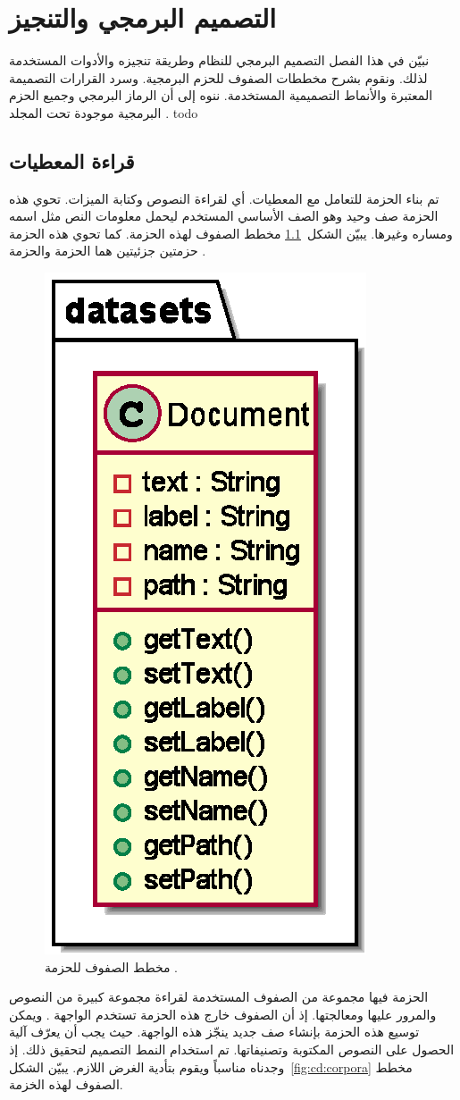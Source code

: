 

\chapter{التصميم البرمجي والتنجيز}
نبيّن في هذا الفصل التصميم البرمجي للنظام وطريقة تنجيزه والأدوات المستخدمة لذلك.
ونقوم بشرح مخططات الصفوف للحزم البرمجية.
وسرد القرارات التصميمة المعتبرة والأنماط التصميمية  المستخدمة.
ننوه إلى أن الرماز البرمجي وجميع الحزم البرمجية موجودة تحت المجلد .
todo




\section{قراءة المعطيات}
تم بناء الحزمة  للتعامل مع المعطيات. أي لقراءة النصوص وكتابة الميزات.
تحوي هذه الحزمة صف وحيد  وهو الصف الأساسي المستخدم ليحمل معلومات النص مثل اسمه ومساره وغيرها.
يبيّن الشكل~\ref{fig:cd:datasets} مخطط الصفوف لهذه الحزمة.
كما تحوي هذه الحزمة حزمتين جزئيتين هما الحزمة  والحزمة .

\begin{figure}[htb]
	\centering
	\includegraphics[width=0.25\linewidth]{images/cd-datasets.eps}
	\caption{%
		مخطط الصفوف للحزمة .
	}
	\label{fig:cd:datasets}
\end{figure}

الحزمة  فيها مجموعة من الصفوف المستخدمة لقراءة مجموعة كبيرة من النصوص والمرور عليها ومعالجتها.
إذ أن الصفوف خارج هذه الحزمة تستخدم الواجهة .
ويمكن توسيع هذه الحزمة بإنشاء صف جديد ينجّز هذه الواجهة.
حيث يجب أن يعرّف آلية الحصول على النصوص المكتوبة وتصنيفاتها.
تم استخدام النمط التصميم  لتحقيق ذلك.
إذ وجدناه مناسباً ويقوم بتأدية الغرض اللازم.
يبيّن الشكل~\ref{fig:cd:corpora} مخطط الصفوف لهذه الخزمة.


